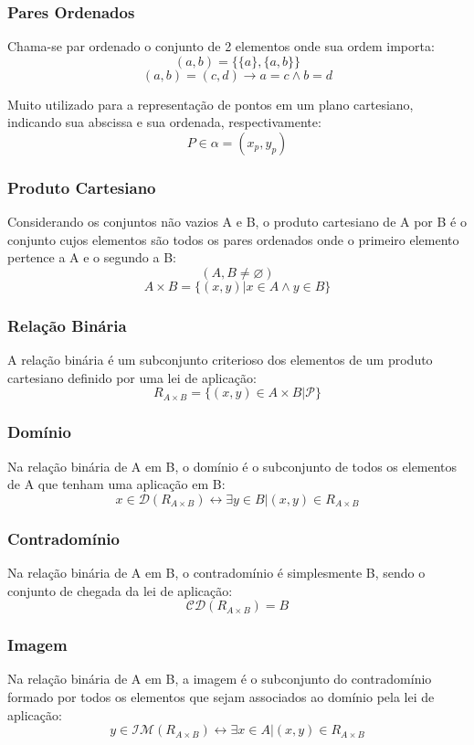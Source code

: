     \subsubsection{Pares Ordenados}
        Chama-se par ordenado o conjunto de 2 elementos onde sua ordem importa:
        \[ (a,b) = \{ \{ a \}, \{ a, b \} \} \]
        \[ (a,b) = (c,d) \rightarrow a = c \wedge b = d \]
        
        Muito utilizado para a representação de pontos em um plano cartesiano, indicando sua abscissa e sua ordenada, respectivamente:
        \[ P \in \alpha = (x_p, y_p) \]
    \subsubsection{Produto Cartesiano}
        Considerando os conjuntos não vazios A e B, o produto cartesiano de A por B é o conjunto cujos elementos são todos os pares ordenados onde o primeiro elemento pertence a A e o segundo a B:
        \[ (A, B \neq \varnothing) \]
        \[ A \times B = \{ (x,y) | x \in A \wedge y \in B \} \]
    \subsubsection{Relação Binária}
        A relação binária é um subconjunto criterioso dos elementos de um produto cartesiano definido por uma lei de aplicação:
        \[ R_{A \times B} = \{ (x,y) \in A \times B | \mathcal{P} \} \]
    \subsubsection{Domínio}
        Na relação binária de A em B, o domínio é o subconjunto de todos os elementos de A que tenham uma aplicação em B:
        \[ x \in \mathcal{D}(R_{A \times B}) \leftrightarrow \exists y \in B | (x,y) \in R_{A \times B} \]
    \subsubsection{Contradomínio}
        Na relação binária de A em B, o contradomínio é simplesmente B, sendo o conjunto de chegada da lei de aplicação:
        \[ \mathcal{CD}(R_{A \times B}) = B \]
    \subsubsection{Imagem}
        Na relação binária de A em B, a imagem é o subconjunto do contradomínio formado por todos os elementos que sejam associados ao domínio pela lei de aplicação:
        \[ y \in \mathcal{IM}(R_{A \times B}) \leftrightarrow \exists x \in A | (x,y) \in R_{A \times B} \]
